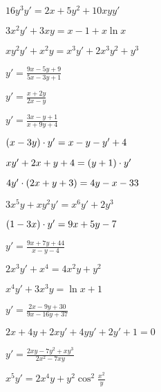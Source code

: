 	\begin{multicols}{2}
		\begin{enumtasks}
			\label{firstorder:homogeneous2}
			\item \( 16y^3 y' = 2x + 5y^2 + 10 xyy' \)												%
			\item \( 3x^2 y' + 3xy = x - 1 + x\ln{x} \) 											%
			\item \( xy^2 y' + x^2 y = x^3y' + 2x^3 y^2 + y^3 \) 									%
			\item \( y' = \frac{9x - 5y + 9}{5x - 3y + 1} \) 										%
			\item \( y' = \frac{x + 2y}{2x - y} \)													%
			\item \( y' =  \frac{3x - y + 1}{x + 9y + 4} \)											%
			\item \( \left( x - 3y \right) \cdot y' = x - y - y' + 4 \) 									%
			\item \( xy' + 2x + y + 4 = \left( y + 1 \right) \cdot y' \) 									%
			\item \( 4y' \cdot \left( 2x + y + 3 \right) = 4y - x - 33 \)									%
			\item \( 3x^5 y + xy^2 y' = x^6 y' + 2y^3 \) 											%
			\item \( \left( 1 - 3x \right) \cdot y' = 9x + 5y - 7 \)										%
			\item \( y' =  \frac{9x + 7y + 44}{x - y - 4} \)										%
			\item \( 2x^3 y' + x^4 = 4x^2 y + y^2 \) 												%
			\item \( x^4 y' + 3x^3 y = \ln{x} + 1 \) 												%
			\item \( y' =  \frac{2x - 9y + 30}{9x - 16y + 37} \)									%
			\item \( 2x + 4y + 2xy' + 4yy' + 2y' + 1 = 0 \) 										%
			\item \( y' = \frac{2xy - 7y^2 + xy^3}{2x^2 - 7xy} \)									%
			\item \( x^5 y' = 2x^4 y + y^2 \cos^2{\frac{x^2}{y}} \)									%

\end{enumtasks}
\end{multicols}
